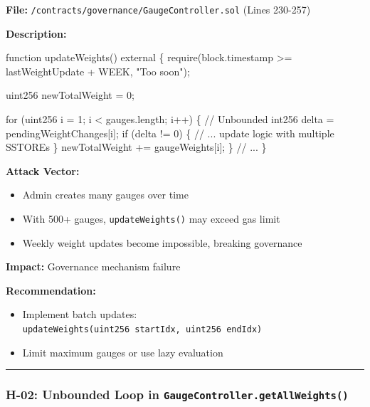 \documentclass[
]{article}
\newenvironment{Shaded}{}{}
\newcommand{\NormalTok}[1]{#1}
\providecommand{\tightlist}{%
  \setlength{\itemsep}{0pt}\setlength{\parskip}{0pt}}
\begin{document}
\textbf{File:} \texttt{/contracts/governance/GaugeController.sol} (Lines
230-257)

\textbf{Description:}

\begin{Shaded}
\begin{Highlighting}[]
\NormalTok{function updateWeights() external \{}
\NormalTok{    require(block.timestamp \textgreater{}= lastWeightUpdate + WEEK, "Too soon");}

\NormalTok{    uint256 newTotalWeight = 0;}

\NormalTok{    for (uint256 i = 1; i \textless{} gauges.length; i++) \{      // Unbounded}
\NormalTok{        int256 delta = pendingWeightChanges[i];}
\NormalTok{        if (delta != 0) \{}
\NormalTok{            // ... update logic with multiple SSTOREs}
\NormalTok{        \}}
\NormalTok{        newTotalWeight += gaugeWeights[i];}
\NormalTok{    \}}
\NormalTok{    // ...}
\NormalTok{\}}
\end{Highlighting}
\end{Shaded}

\textbf{Attack Vector:}

\begin{itemize}
\tightlist
\item
  Admin creates many gauges over time
\item
  With 500+ gauges, \texttt{updateWeights()} may exceed gas limit
\item
  Weekly weight updates become impossible, breaking governance
\end{itemize}

\textbf{Impact:} Governance mechanism failure

\textbf{Recommendation:}

\begin{itemize}
\tightlist
\item
  Implement batch updates:
  \texttt{updateWeights(uint256\ startIdx,\ uint256\ endIdx)}
\item
  Limit maximum gauges or use lazy evaluation
\end{itemize}

\begin{center}\rule{0.5\linewidth}{0.5pt}\end{center}

\subsubsection{\texorpdfstring{H-02: Unbounded Loop in
\texttt{GaugeController.getAllWeights()}}{H-02: Unbounded Loop in GaugeController.getAllWeights()}}\label{h-02-unbounded-loop-in-gaugecontrollergetallweights}
\end{document}
